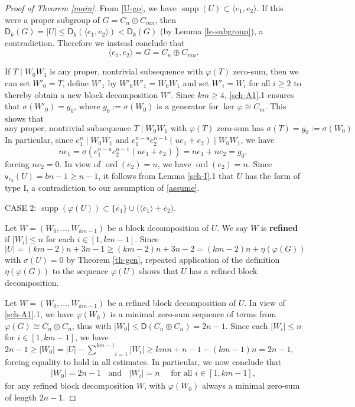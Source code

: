\documentclass[11pt]{amsart}
\theoremstyle{definition}
\DeclareMathOperator{\ord}{ord}
\DeclareMathOperator{\supp}{supp}
\newcommand{\la}{\langle}
\newcommand{\ra}{\rangle}
\newcommand{\be}{\begin{equation}}
\newcommand{\ee}{\end{equation}}
\newcommand{\und}{\;\mbox{ and }\;}
\newcommand{\Sum}[2]{\underset{#1}{\overset{#2}{\sum}}}
\numberwithin{equation}{section}
\begin{document}
\begin{proof}[Proof of Theorem \ref{main}]
	From \eqref{U-go}, we have $\supp(U)\subset \la e_1,e_2\ra$. If this were a proper subgroup of $G=C_{n}\oplus C_{mn}$, then  $\mathsf D_k(G)=|U|\le \mathsf D_k(\la e_1,e_2\ra)<\mathsf D_k(G)$ (by Lemma \ref{le-subgroup}), a contradiction. Therefore we instead conclude that \be\label{keyboard}\la e_1,e_2\ra=G=C_n\oplus C_{mn}.\ee
	
	
	If $T\mid W_0 W_1$ is any proper, nontrivial subsequence with $\varphi(T)$ zero-sum, then we can set $W'_0=T$, define $W'_1$ by $W'_0 W'_1=W_0 W_1$ and set $W'_i=W_i$ for all $i\geq 2$ to thereby obtain a new block decomposition $W'$. Since $km\ge 4$, \ref{sch-A1}.1 ensures that $\sigma(W'_0)=g_0$, where $g_0:=\sigma(W_0)$ is a generator for $\ker\varphi\cong C_m$.
	This shows that  \be\label{sticky}\mbox{any proper, nontrivial subsequence $T\mid W_0 W_1$ with $\varphi(T)$ zero-sum has $\sigma(T)=g_0:=\sigma(W_0)$}.\ee
	In particular, since $e_1^n\mid W_0 W_1$  and $e_1^{n-u} e_2^{n-1} (ue_1+e_2)\mid W_0 W_1$, we have $$ ne_1=\sigma(e_1^{n-u} e_2^{n-1} (ue_1+e_2))=ne_1+ne_2=g_0,$$ 
	forcing $ne_2=0$. In view of $\ord(\overline e_2)=n$, we have $\ord(e_2)=n$.
	 Since $\mathsf v_{e_2}(U)=bn-1\ge n-1$, it follows from Lemma \ref{sch-I}.1 that $U$ has the form of type I, a contradiction to our assumption of \eqref{assume}.
	
	
	
	\smallskip
	\noindent
	CASE 2: $\supp(\varphi(U))\subset \{\overline e_1\}\cup\big(\la \overline e_1\ra+\overline e_2\big)$.
	
Let $W=(W_0,\ldots,W_{km-1})$ be a block decomposition of $U$.	We say $W$ is {\bf refined} if  $|W_i|\leq n$ for each $i\in [1,km-1]$.
Since $|U|=(km-2)n+3n-1\geq (km-2)n+3n-2=(km-2)n+\eta(\varphi(G))$ with $\sigma(U)=0$ by Theorem \ref{th-gen}, repeated application of the definition $\eta(\varphi(G))$ to the sequence $\varphi(U)$ shows that $U$ has a refined block decomposition.

 
 Let $W=(W_0,\ldots,W_{km-1})$ be a refined block decomposition of $U$. In view of \ref{sch-A1}.1, we have
 $\varphi(W_0)$ is a minimal zero-sum sequence of terms from $\varphi(G)\cong C_n\oplus C_n$, thus with $|W_0|\leq \mathsf D(C_n\oplus C_n)=2n-1$. Since each $|W_i|\leq n$ for $i\in [1,km-1]$, we have $2n-1\geq |W_0|=|U|-\Sum{i=1}{km-1}|W_i|\geq kmn+n-1-(km-1)n=2n-1$, forcing equality to hold in all estimates. In particular, we now conclude that
\begin{align}\label{blockhelp} |W_0|=2n-1\;\und\;|W_i|=n\quad\mbox{ for all $i\in [1,km-1]$},\end{align} for any refined block decomposition $W$, with $\varphi(W_0)$ always a minimal zero-sum of length $2n-1$.
	

\end{proof}
\end{document}
